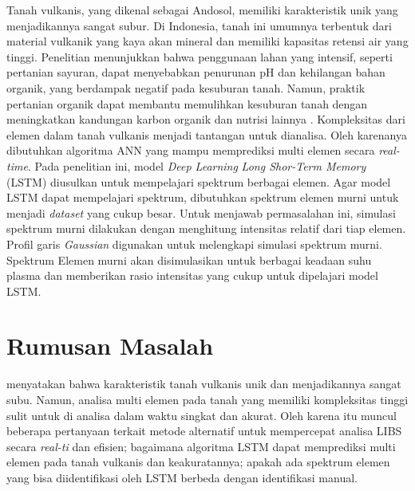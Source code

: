 \par Tanah vulkanis, yang dikenal sebagai Andosol, memiliki karakteristik unik yang menjadikannya sangat subur. Di Indonesia, tanah ini umumnya terbentuk dari material vulkanik yang kaya akan mineral dan memiliki kapasitas retensi air yang tinggi. Penelitian menunjukkan bahwa penggunaan lahan yang intensif, seperti pertanian sayuran, dapat menyebabkan penurunan pH dan kehilangan bahan organik, yang berdampak negatif pada kesuburan tanah. Namun, praktik pertanian organik dapat membantu memulihkan kesuburan tanah dengan meningkatkan kandungan karbon organik dan nutrisi lainnya \citep{fiantis2020land}. Kompleksitas dari elemen dalam tanah vulkanis menjadi tantangan untuk dianalisa. Oleh karenanya dibutuhkan algoritma ANN yang mampu memprediksi multi elemen secara \textit{real-time}. Pada penelitian ini, model \textit{Deep Learning} \textit{Long Shor-Term Memory} (LSTM) diusulkan untuk mempelajari spektrum berbagai elemen. Agar model LSTM dapat mempelajari spektrum, dibutuhkan spektrum elemen murni untuk menjadi \textit{dataset} yang cukup besar. Untuk menjawab permasalahan ini, simulasi spektrum murni dilakukan dengan menghitung intensitas relatif dari tiap elemen. Profil garis \textit{Gaussian} digunakan untuk melengkapi simulasi spektrum murni. Spektrum Elemen murni akan disimulasikan untuk berbagai keadaan suhu plasma dan memberikan rasio intensitas yang cukup untuk dipelajari model LSTM.


\section{Rumusan Masalah}
\par \cite{fiantis2020land} menyatakan bahwa karakteristik tanah vulkanis unik dan menjadikannya sangat subu. Namun, analisa multi elemen pada tanah yang memiliki kompleksitas tinggi sulit untuk di analisa dalam waktu singkat dan akurat. Oleh karena itu muncul beberapa pertanyaan terkait metode alternatif untuk mempercepat analisa LIBS secara \textit{real-ti} dan efisien; bagaimana algoritma LSTM dapat memprediksi multi elemen pada tanah vulkanis dan keakuratannya; apakah ada spektrum elemen yang bisa diidentifikasi oleh LSTM berbeda dengan identifikasi manual.

